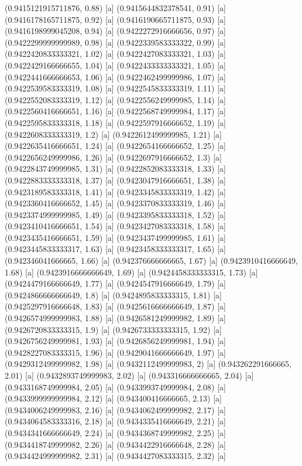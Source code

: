 {{{(0.9415121915711876, 0.88) [a] 
(0.9415644832378541, 0.91) [a] 
(0.9416178165711875, 0.92) [a] 
(0.9416190665711875, 0.93) [a] 
(0.9416198999045208, 0.94) [a] 
(0.9422272916666656, 0.97) [a] 
(0.9422299999999989, 0.98) [a] 
(0.9422339583333322, 0.99) [a] 
(0.9422420833333321, 1.02) [a] 
(0.9422427083333321, 1.03) [a] 
(0.9422429166666655, 1.04) [a] 
(0.9422433333333321, 1.05) [a] 
(0.9422441666666653, 1.06) [a] 
(0.9422462499999986, 1.07) [a] 
(0.9422539583333319, 1.08) [a] 
(0.9422545833333319, 1.11) [a] 
(0.9422552083333319, 1.12) [a] 
(0.9422556249999985, 1.14) [a] 
(0.9422560416666651, 1.16) [a] 
(0.9422568749999984, 1.17) [a] 
(0.9422595833333318, 1.18) [a] 
(0.9422597916666652, 1.19) [a] 
(0.9422608333333319, 1.2) [a] 
(0.9422612499999985, 1.21) [a] 
(0.9422635416666651, 1.24) [a] 
(0.9422654166666652, 1.25) [a] 
(0.9422656249999986, 1.26) [a] 
(0.9422697916666652, 1.3) [a] 
(0.9422843749999985, 1.31) [a] 
(0.9422852083333318, 1.33) [a] 
(0.9422883333333318, 1.37) [a] 
(0.9423047916666651, 1.38) [a] 
(0.9423189583333318, 1.41) [a] 
(0.9423345833333319, 1.42) [a] 
(0.9423360416666652, 1.45) [a] 
(0.9423370833333319, 1.46) [a] 
(0.9423374999999985, 1.49) [a] 
(0.9423395833333318, 1.52) [a] 
(0.9423410416666651, 1.54) [a] 
(0.9423427083333318, 1.58) [a] 
(0.9423435416666651, 1.59) [a] 
(0.9423437499999985, 1.61) [a] 
(0.9423445833333317, 1.63) [a] 
(0.9423458333333317, 1.65) [a] 
(0.942346041666665, 1.66) [a] 
(0.942376666666665, 1.67) [a] 
(0.9423910416666649, 1.68) [a] 
(0.9423916666666649, 1.69) [a] 
(0.9424458333333315, 1.73) [a] 
(0.9424479166666649, 1.77) [a] 
(0.9424547916666649, 1.79) [a] 
(0.9424866666666649, 1.8) [a] 
(0.9424895833333315, 1.81) [a] 
(0.9425297916666648, 1.83) [a] 
(0.9425616666666649, 1.87) [a] 
(0.9426574999999983, 1.88) [a] 
(0.9426581249999982, 1.89) [a] 
(0.9426720833333315, 1.9) [a] 
(0.9426733333333315, 1.92) [a] 
(0.9426756249999981, 1.93) [a] 
(0.9426856249999981, 1.94) [a] 
(0.9428227083333315, 1.96) [a] 
(0.9429041666666649, 1.97) [a] 
(0.9429312499999982, 1.98) [a] 
(0.9432112499999983, 2) [a] 
(0.943262291666665, 2.01) [a] 
(0.9432893749999983, 2.02) [a] 
(0.943316666666665, 2.04) [a] 
(0.9433168749999984, 2.05) [a] 
(0.9433993749999984, 2.08) [a] 
(0.9433999999999984, 2.12) [a] 
(0.943400416666665, 2.13) [a] 
(0.9434006249999983, 2.16) [a] 
(0.9434062499999982, 2.17) [a] 
(0.9434064583333316, 2.18) [a] 
(0.9434335416666649, 2.21) [a] 
(0.9434341666666649, 2.24) [a] 
(0.9434368749999982, 2.25) [a] 
(0.9434418749999982, 2.26) [a] 
(0.9434422916666648, 2.28) [a] 
(0.9434424999999982, 2.31) [a] 
(0.9434427083333315, 2.32) [a] 
}}}
